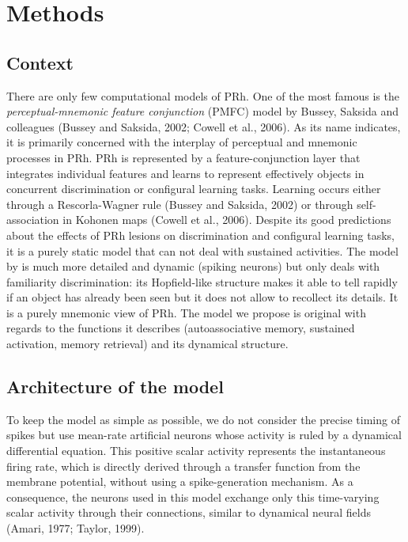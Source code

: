 \documentclass[
  11pt,
  a4paper,
]{scrbook}
\begin{document}
\section{Methods}\label{methods}

\subsection{Context}\label{context}

There are only few computational models of PRh. One of the most famous
is the \emph{perceptual-mnemonic feature conjunction} (PMFC) model by
Bussey, Saksida and colleagues (Bussey and Saksida, 2002; Cowell et al.,
2006). As its name indicates, it is primarily concerned with the
interplay of perceptual and mnemonic processes in PRh. PRh is
represented by a feature-conjunction layer that integrates individual
features and learns to represent effectively objects in concurrent
discrimination or configural learning tasks. Learning occurs either
through a Rescorla-Wagner rule (Bussey and Saksida, 2002) or through
self-association in Kohonen maps (Cowell et al., 2006). Despite its good
predictions about the effects of PRh lesions on discrimination and
configural learning tasks, it is a purely static model that can not deal
with sustained activities. The model by is much more detailed and
dynamic (spiking neurons) but only deals with familiarity
discrimination: its Hopfield-like structure makes it able to tell
rapidly if an object has already been seen but it does not allow to
recollect its details. It is a purely mnemonic view of PRh. The model we
propose is original with regards to the functions it describes
(autoassociative memory, sustained activation, memory retrieval) and its
dynamical structure.

\subsection{Architecture of the model}\label{architecture-of-the-model}

To keep the model as simple as possible, we do not consider the precise
timing of spikes but use mean-rate artificial neurons whose activity is
ruled by a dynamical differential equation. This positive scalar
activity represents the instantaneous firing rate, which is directly
derived through a transfer function from the membrane potential, without
using a spike-generation mechanism. As a consequence, the neurons used
in this model exchange only this time-varying scalar activity through
their connections, similar to dynamical neural fields (Amari, 1977;
Taylor, 1999).
\end{document}
